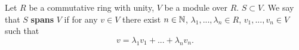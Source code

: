 \begin{definition}
  Let
    $R$ be a commutative ring with unity,
    $V$ be a module over $R$.
    $S \subset V$.
  We say that $S$ \textbf{spans} $V$ if
  for any $v \in V$
  there exist $n \in \mathbb{N}$, $\lambda_1, ..., \lambda_n \in R$,
  $v_1, ..., v_n \in V$ such that
  \begin{equation}
    v = \lambda_1 v_1 + ... + \lambda_n v_n.
  \end{equation}
\end{definition}
